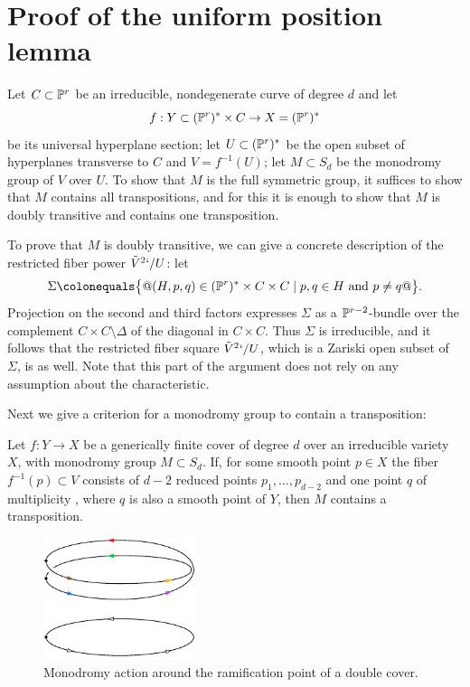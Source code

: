 \section{Proof of the uniform position
lemma
}

Let $C \subset \PP^r$ be an irreducible, nondegenerate curve of degree $d$
and
let
$$f : Y \subset (\PP^r)^* \times C \to  X = (\PP^r)^*$$
be
its universal
hyperplane section; let $U \subset (\PP^r)^*$ be the open subset of
hyperplanes transverse to $C$ and $V = f^{-1}(U)$; let $M \subset S_d$
be the monodromy group of $V$ over $U$.
To show that  $M$ is the full symmetric group, it suffices to show that
$M$ contains all transpositions, and for this it is enough to show that
%
$M$ is doubly transitive and contains one transposition.

To prove that $M$ is doubly transitive, we can give a concrete description
\vadjust{\allowbreak}%
of the restricted fiber power $\tilde V^2`/U$: let
%
$$
\Sigma \colonequals  \bigl\{@ (H, p, q) \in (\PP^r)^* \times C \times C
\mid p, q \in H \text{ and } p \neq q @\bigr\}.
$$
Projection on the second and third factors expresses $\Sigma$ as a
$\PP^{r-2}$-bundle over the complement $C \times C \setminus \Delta$
of the diagonal in $C \times C$. Thus $\Sigma$ is irreducible, and it
follows that the restricted fiber square $\tilde V^2`/U$, which is a
Zariski open subset of $\Sigma$, is as well. Note that this part of the
argument does not rely on any assumption about the characteristic.

Next we give a criterion for a monodromy group to contain a transposition:

\begin{lemma}\label{transposition lemma}
Let $f : Y \to X$ be a generically finite cover of degree $d$ over an
%
irreducible variety $X$, with  monodromy group $M \subset S_d$.
If,  for some smooth point $p \in X$ the fiber $f^{-1}(p)\subset V$
consists of $d-2$ reduced points $p_1,\dots, p_{d-2}$ and one point $q$
of multiplicity \2, where $q$ is also a smooth point of $Y$, then $M$
contains a transposition.
\end{lemma}

\begin{figure}
\centerline {\includegraphics[height=1.4in]{main/Fig10-1}}
\vskip-5pt
\caption{Monodromy action around the ramification point of a double cover.}
\label{$d=2$ monodromy}
\end{figure}

